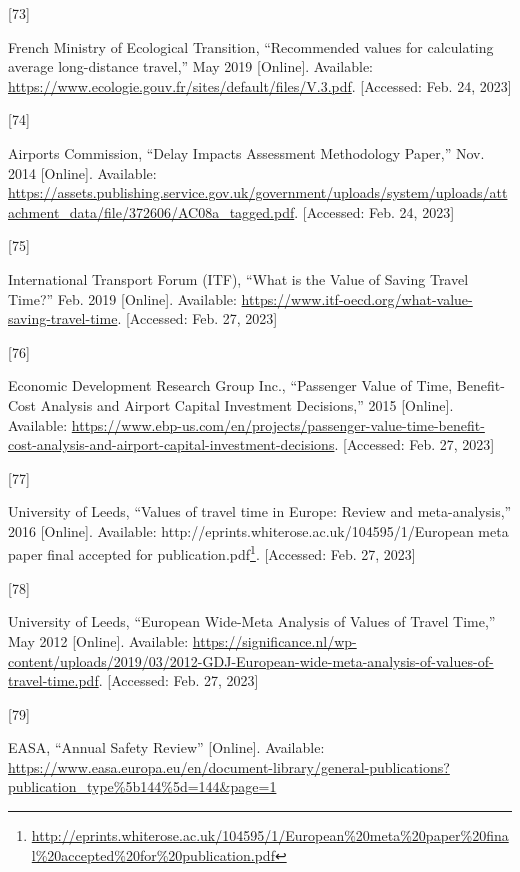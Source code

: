 \documentclass[
  11pt,
  a4paper,
]{book}
\newlength{\cslhangindent}
\newlength{\csllabelwidth}
\newlength{\cslentryspacingunit} %
\newenvironment{CSLReferences}[2] %
 {%
  \setlength{\parindent}{0pt}
  \ifodd #1
  \let\oldpar\par
  \def\par{\hangindent=\cslhangindent\oldpar}
  \fi
  \setlength{\parskip}{#2\cslentryspacingunit}
 }%
 {}
\newcommand{\CSLLeftMargin}[1]{\parbox[t]{\csllabelwidth}{#1}}
\newcommand{\CSLRightInline}[1]{\parbox[t]{\linewidth - \csllabelwidth}{#1}\break}
\DeclareRobustCommand{\href}[2]{#2\footnote{\url{#1}}}
\begin{document}
\begin{CSLReferences}{0}{0}
\leavevmode{}%
\CSLLeftMargin{{[}73{]} }%
\CSLRightInline{French Ministry of Ecological Transition, {``Recommended
values for calculating average long-distance travel,''} May 2019
{[}Online{]}. Available:
\url{https://www.ecologie.gouv.fr/sites/default/files/V.3.pdf}.
{[}Accessed: Feb. 24, 2023{]}}

\leavevmode{}%
\CSLLeftMargin{{[}74{]} }%
\CSLRightInline{Airports Commission, {``Delay {Impacts Assessment}
{Methodology Paper},''} Nov. 2014 {[}Online{]}. Available:
\url{https://assets.publishing.service.gov.uk/government/uploads/system/uploads/attachment_data/file/372606/AC08a_tagged.pdf}.
{[}Accessed: Feb. 24, 2023{]}}

\leavevmode{}%
\CSLLeftMargin{{[}75{]} }%
\CSLRightInline{International Transport Forum (ITF), {``What is the
{Value} of {Saving Travel Time}?''} Feb. 2019 {[}Online{]}. Available:
\url{https://www.itf-oecd.org/what-value-saving-travel-time}.
{[}Accessed: Feb. 27, 2023{]}}

\leavevmode{}%
\CSLLeftMargin{{[}76{]} }%
\CSLRightInline{Economic Development Research Group Inc., {``Passenger
{Value} of {Time}, {Benefit-Cost Analysis} and {Airport Capital
Investment Decisions},''} 2015 {[}Online{]}. Available:
\url{https://www.ebp-us.com/en/projects/passenger-value-time-benefit-cost-analysis-and-airport-capital-investment-decisions}.
{[}Accessed: Feb. 27, 2023{]}}

\leavevmode{}%
\CSLLeftMargin{{[}77{]} }%
\CSLRightInline{University of Leeds, {``Values of travel time in
{Europe}: {Review} and meta-analysis,''} 2016 {[}Online{]}. Available:
\href{http://eprints.whiterose.ac.uk/104595/1/European\%20meta\%20paper\%20final\%20accepted\%20for\%20publication.pdf}{http://eprints.whiterose.ac.uk/104595/1/European
meta paper final accepted for publication.pdf}. {[}Accessed: Feb. 27,
2023{]}}

\leavevmode{}%
\CSLLeftMargin{{[}78{]} }%
\CSLRightInline{University of Leeds, {``European {Wide-Meta Analysis} of
{Values} of {Travel Time},''} May 2012 {[}Online{]}. Available:
\url{https://significance.nl/wp-content/uploads/2019/03/2012-GDJ-European-wide-meta-analysis-of-values-of-travel-time.pdf}.
{[}Accessed: Feb. 27, 2023{]}}

\leavevmode{}%
\CSLLeftMargin{{[}79{]} }%
\CSLRightInline{EASA, {``Annual {Safety Review}''} {[}Online{]}.
Available:
\url{https://www.easa.europa.eu/en/document-library/general-publications?publication_type\%5b144\%5d=144\&page=1}}


\end{CSLReferences}
\end{document}
